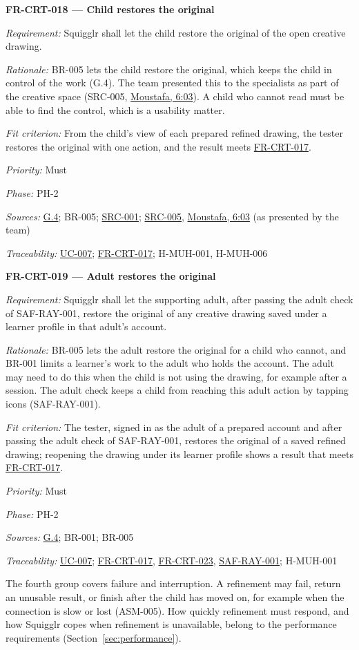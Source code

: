 \documentclass[12pt]{article}
\renewcommand{\_}{\textunderscore\allowbreak}%
\newcommand{\intlink}[3]{\hyperref[int:#1-#2]{#3}}
\newcommand{\intref}[2]{\intlink{#1}{#2}{#1, #2}}
\newcommand{\goalref}[1]{\hyperref[goal:#1]{G.#1}}
\newcommand{\ucref}[1]{\hyperref[uc:#1]{\mbox{UC-#1}}}
\newenvironment{srsrequirement}[2]{%
  \par\medskip\noindent\phantomsection\label{req:#1}%
  \textbf{#1 --- #2}\par\nobreak\smallskip }{\par\medskip}
\newcommand{\reqfield}[2]{\noindent\textit{#1:} #2\par}
\newcommand{\reqshall}[1]{\reqfield{Requirement}{#1}}
\newcommand{\reqrationale}[1]{\reqfield{Rationale}{#1}}
\newcommand{\reqfit}[1]{\reqfield{Fit criterion}{#1}}
\newcommand{\reqpriority}[1]{\reqfield{Priority}{#1}}
\newcommand{\reqphase}[1]{\reqfield{Phase}{#1}}
\newcommand{\reqsources}[1]{\reqfield{Sources}{#1}}
\newcommand{\reqtraces}[1]{\reqfield{Traceability}{#1}}
\newcommand{\reqref}[1]{\hyperref[req:#1]{#1}}
\newcommand{\srcref}[1]{\hyperref[src:#1]{SRC-#1}}
\providecommand{\ucref}[1]{\hyperref[uc:#1]{UC-#1}}
\begin{document}
\begin{srsrequirement}{FR-CRT-018}{Child restores the original}
  \reqshall{Squigglr shall let the child restore the original of the open
creative drawing.} \reqrationale{BR-005 lets the child restore the original,
which keeps the child in control of the work (G.4). The team presented this to
the specialists as part of the creative space (SRC-005,
\intref{Moustafa}{6:03}). A child who cannot read must be able to find the
control, which is a usability matter.} \reqfit{From the child's view of each
prepared refined drawing, the tester restores the original with one action, and
the result meets \reqref{FR-CRT-017}.}
  \reqpriority{Must}
  \reqphase{PH-2}
  \reqsources{\goalref{4}; BR-005; \srcref{001}; \srcref{005},
\intref{Moustafa}{6:03} (as presented by the team)} \reqtraces{\ucref{007};
\reqref{FR-CRT-017}; H-MUH-001, H-MUH-006}
\end{srsrequirement}

\begin{srsrequirement}{FR-CRT-019}{Adult restores the original}
  \reqshall{Squigglr shall let the supporting adult, after passing the adult
check of SAF-RAY-001, restore the original of any creative drawing saved under a
learner profile in that adult's account.} \reqrationale{BR-005 lets the adult
restore the original for a child who cannot, and BR-001 limits a learner's work
to the adult who holds the account. The adult may need to do this when the child
is not using the drawing, for example after a session. The adult check keeps a
child from reaching this adult action by tapping icons (SAF-RAY-001).}
\reqfit{The tester, signed in as the adult of a prepared account and after
passing the adult check of SAF-RAY-001, restores the original of a saved refined
drawing; reopening the drawing under its learner profile shows a result that
meets \reqref{FR-CRT-017}.}
  \reqpriority{Must}
  \reqphase{PH-2}
  \reqsources{\goalref{4}; BR-001; BR-005} \reqtraces{\ucref{007};
  \reqref{FR-CRT-017}, \reqref{FR-CRT-023}, \reqref{SAF-RAY-001}; H-MUH-001}
\end{srsrequirement}

The fourth group covers failure and interruption. A refinement may fail, return
an unusable result, or finish after the child has moved on, for example when the
connection is slow or lost (ASM-005). How quickly refinement must respond, and
how Squigglr copes when refinement is unavailable, belong to the performance
requirements (Section~\ref{sec:performance}).
\end{document}
